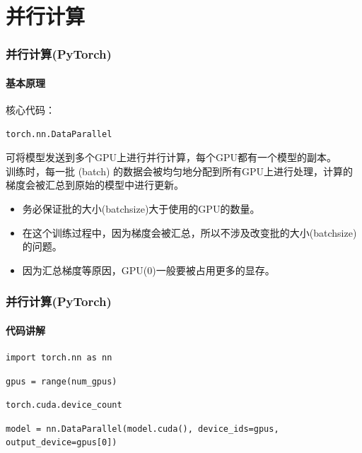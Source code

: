 \documentclass[10pt]{beamer}
\begin{document}
    \section{并行计算}
        \begin{frame}[fragile]
            \frametitle{并行计算(PyTorch)}
                \framesubtitle{基本原理}
                    核心代码： \\
                    \begin{lstlisting}
torch.nn.DataParallel                    
                    \end{lstlisting}
                    可将模型发送到多个GPU上进行并行计算，每个GPU都有一个模型的副本。\\
                    训练时，每一批 (batch) 的数据会被均匀地分配到所有GPU上进行处理，计算的梯度会被汇总到原始的模型中进行更新。\\
                    \hspace*{\fill}
                    \begin{itemize}
                        \item 务必保证批的大小(batchsize)大于使用的GPU的数量。
                        \item 在这个训练过程中，因为梯度会被汇总，所以不涉及改变批的大小(batchsize)的问题。
                        \item 因为汇总梯度等原因，GPU(0)一般要被占用更多的显存。
                    \end{itemize}

        \end{frame}

        \begin{frame}[fragile]
            \frametitle{并行计算(PyTorch)}
                \framesubtitle{代码讲解}
                    \begin{lstlisting}[basicstyle=\small]
import torch.nn as nn
                    \end{lstlisting}
                    \begin{lstlisting}[basicstyle=\small]
gpus = range(num_gpus)
                    \end{lstlisting}
                    \begin{lstlisting}[basicstyle=\small]
torch.cuda.device_count
                    \end{lstlisting}
                    \begin{lstlisting}[basicstyle=\small]
model = nn.DataParallel(model.cuda(), device_ids=gpus, output_device=gpus[0]) 
                    \end{lstlisting}

        \end{frame}
\end{document}
